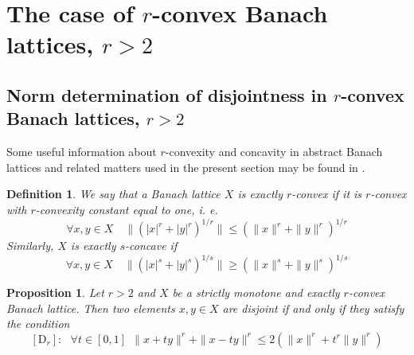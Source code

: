 \documentclass[11pt]{amsart}
\theoremstyle{plain}
\newtheorem{definition}[theorem]{Definition}
\newtheorem{proposition}[theorem]{Proposition}
\theoremstyle{remark}
\begin{document}
\section{The case of  $r$-convex  Banach lattices, $r>2$}\label{r-convex-BL}

\subsection{Norm determination of  disjointness in $r$-convex  Banach lattices, $r>2$}\hfill\break

Some useful information about $r$-convexity and concavity in abstract Banach lattices and related matters used in the present section may be found in \cite[sec. 1.d]{LT}.

\begin{definition} We say that a Banach lattice $X$ is {\it exactly $r$-convex} if it is $r$-convex with $r$-convexity constant equal to one, i. e.
\[\forall  x,y\in X\quad  \|(|x|^r+|y|^r)^{1/r}\|\le (\|x\|^r+\|y\|^r)^{1/r}\]
Similarly, $X$ is exactly $s$-concave if
\[\forall  x,y\in X\quad  \|(|x|^s+|y|^s)^{1/s}\|\ge (\|x\|^s+\|y\|^s)^{1/s}\]
\end{definition}

\begin{proposition}\label{disjointcharacter} 
Let $r>2$ and $X$ be a strictly monotone and exactly $r$-convex Banach lattice.
Then two elements $x,y\in X$ are disjoint if and only if they satisfy the condition 
\[
[\mathrm D_r]:\ \ \  \forall t\in [0,1]\ \ \|x+ty\|^r+\|x-ty\|^r\le 2 (\|x\|^r+t^r\|y\|^r)
\]
\end{proposition}
\end{document}
